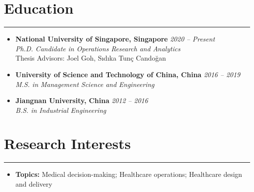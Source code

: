 \documentclass[12pt, a4paper]{article}
\begin{document}
{\small

\section*{Education}
\vspace*{0.4em}
\hrule height 0.5pt

\begin{itemize}[leftmargin=0pt, itemsep=6pt, parsep=0.2pt, topsep=1pt]

	\item[]
	\textbf{National University of Singapore, Singapore} \hfill \textit{2020 -- Present} \\
	\textit{Ph.D. Candidate in Operations Research and Analytics} \\
	Thesis Advisors: Joel Goh, S\i{}d\i{}ka Tun\c{c} Cando\u{g}an

	\item[]
	\textbf{University of Science and Technology of China, China} \hfill \textit{2016 -- 2019} \\
	\textit{M.S. in Management Science and Engineering}

	\item[]
	\textbf{Jiangnan University, China} \hfill \textit{2012 -- 2016} \\
	\textit{B.S. in Industrial Engineering}

\end{itemize}




\section*{Research Interests}
\vspace*{0.4em}
\hrule height 0.5pt

\begin{itemize}[leftmargin=14pt, itemsep=6pt, parsep=0.2pt, topsep=1pt]

	\item[] \textbf{Topics:} Medical decision-making; Healthcare operations; Healthcare design and delivery
	

\end{itemize}}
\end{document}
